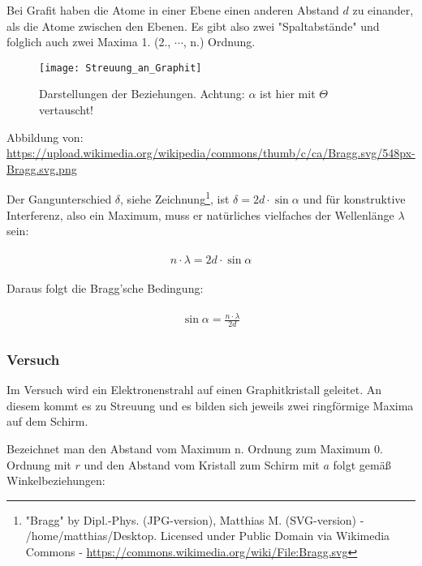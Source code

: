 \begin{Wichtig}
	Bei Grafit haben die Atome in einer Ebene einen anderen Abstand $d$ zu einander, als die Atome zwischen den Ebenen. Es gibt also zwei "Spaltabstände" und folglich auch zwei Maxima 1. (2., $\cdots$, n.) Ordnung.
\end{Wichtig}

\begin{figure}[h!]
	\centering 
	\texttt{[image: Streuung\_an\_Graphit]}
	\caption{Darstellungen der Beziehungen. Achtung: $\alpha$ ist hier mit $\Theta$ vertauscht!}
	\label{fig:e-angrafit}
\end{figure}

Abbildung von: \url{https://upload.wikimedia.org/wikipedia/commons/thumb/c/ca/Bragg.svg/548px-Bragg.svg.png}

Der Gangunterschied $\delta$, siehe Zeichnung\footnote{"Bragg" by Dipl.-Phys. (JPG-version), Matthias M. (SVG-version) - /home/matthias/Desktop. Licensed under Public Domain via Wikimedia Commons - \url{https://commons.wikimedia.org/wiki/File:Bragg.svg}}, ist $\delta = 2d \cdot \sin{\alpha}$ und für konstruktive Interferenz, also ein Maximum, muss er natürliches vielfaches der Wellenlänge $\lambda$ sein:

\begin{align}
\begin{split}
	n \cdot \lambda = 2d \cdot \sin{\alpha}
\end{split}
\end{align}

\noindent Daraus folgt die Bragg'sche Bedingung:

\begin{align}
\begin{split}
	\sin{\alpha} = \frac{n \cdot \lambda}{2d}
\end{split}
\end{align}


\subsubsection{Versuch}

Im Versuch wird ein Elektronenstrahl auf einen Graphitkristall geleitet. An diesem kommt es zu Streuung und es bilden sich jeweils zwei ringförmige Maxima auf dem Schirm.

Bezeichnet man den Abstand vom Maximum n. Ordnung zum Maximum 0. Ordnung mit $r$ und den Abstand vom Kristall zum Schirm mit $a$ folgt gemäß Winkelbeziehungen:

